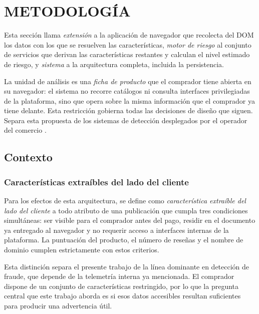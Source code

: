 
\section{METODOLOGÍA}

Esta sección llama \emph{extensión} a la aplicación de navegador que recolecta del DOM los
datos con los que se resuelven las características, \emph{motor de riesgo} al conjunto de
servicios que derivan las características restantes y calculan el nivel estimado de riesgo, y
\emph{sistema} a la arquitectura completa, incluida la persistencia.

La unidad de análisis es una \emph{ficha de producto} que el comprador tiene abierta en su
navegador: el sistema no recorre catálogos ni consulta interfaces privilegiadas de la
plataforma, sino que opera sobre la misma información que el comprador ya tiene delante. Esta
restricción gobierna todas las decisiones de diseño que siguen. Separa esta propuesta de los
sistemas de detección desplegados por el operador del comercio \cite{ref28}.

\subsection{Contexto}

\subsubsection{Características extraíbles del lado del cliente}

Para los efectos de esta arquitectura, se define como \emph{característica extraíble del lado
del cliente} a todo atributo de una publicación que cumpla tres condiciones simultáneas: ser
visible para el comprador antes del pago, residir en el documento ya entregado al navegador y
no requerir acceso a interfaces internas de la plataforma. La puntuación del producto, el
número de reseñas y el nombre de dominio cumplen estrictamente con estos criterios.

Esta distinción separa el presente trabajo de la línea dominante en detección de fraude, que
depende de la telemetría interna ya mencionada. El comprador dispone de un conjunto de
características restringido, por lo que la pregunta central que este trabajo aborda es si esos
datos accesibles resultan suficientes para producir una advertencia útil.

